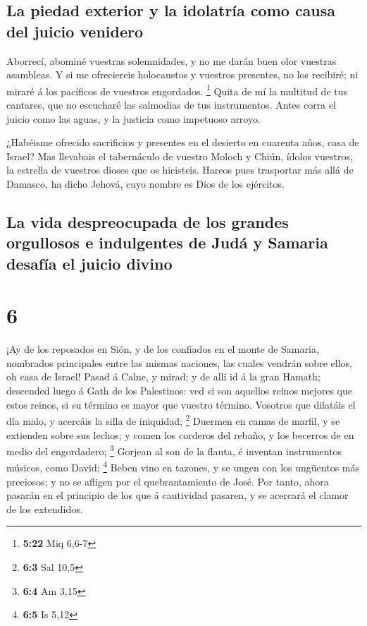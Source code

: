 \hypertarget{la-piedad-exterior-y-la-idolatruxeda-como-causa-del-juicio-venidero}{%
\subsection{La piedad exterior y la idolatría como causa del juicio
venidero}\label{la-piedad-exterior-y-la-idolatruxeda-como-causa-del-juicio-venidero}}

 Aborrecí, abominé vuestras solemnidades, y no me darán
buen olor vuestras asambleas.  Y si me ofreciereis
holocaustos y vuestros presentes, no los recibiré; ni miraré á los
pacíficos de vuestros engordados. \footnote{\textbf{5:22} Miq 6,6-7}
 Quita de mí la multitud de tus cantares, que no
escucharé las salmodias de tus instrumentos.  Antes corra
el juicio como las aguas, y la justicia como impetuoso arroyo.

 ¿Habéisme ofrecido sacrificios y presentes en el
desierto en cuarenta años, casa de Israel?  Mas llevabais
el tabernáculo de vuestro Moloch y Chiún, ídolos vuestros, la estrella
de vuestros dioses que os hicisteis.  Hareos pues
trasportar más allá de Damasco, ha dicho Jehová, cuyo nombre es Dios de
los ejércitos.

\hypertarget{la-vida-despreocupada-de-los-grandes-orgullosos-e-indulgentes-de-juduxe1-y-samaria-desafuxeda-el-juicio-divino}{%
\subsection{La vida despreocupada de los grandes orgullosos e
indulgentes de Judá y Samaria desafía el juicio
divino}\label{la-vida-despreocupada-de-los-grandes-orgullosos-e-indulgentes-de-juduxe1-y-samaria-desafuxeda-el-juicio-divino}}

\hypertarget{section-5}{%
\section{6}\label{section-5}}

 ¡Ay de los reposados en Sión, y de los confiados en el
monte de Samaria, nombrados principales entre las mismas naciones, las
cuales vendrán sobre ellos, oh casa de Israel!  Pasad á
Calne, y mirad; y de allí id á la gran Hamath; descended luego á Gath de
los Palestinos: ved si son aquellos reinos mejores que estos reinos, si
su término es mayor que vuestro término.  Vosotros que
dilatáis el día malo, y acercáis la silla de iniquidad; \footnote{\textbf{6:3}
  Sal 10,5}  Duermen en camas de marfil, y se extienden
sobre sus lechos; y comen los corderos del rebaño, y los becerros de en
medio del engordadero; \footnote{\textbf{6:4} Am 3,15} 
Gorjean al son de la flauta, é inventan instrumentos músicos, como
David; \footnote{\textbf{6:5} Is 5,12}  Beben vino en
tazones, y se ungen con los ungüentos más preciosos; y no se afligen por
el quebrantamiento de José.  Por tanto, ahora pasarán en
el principio de los que á cautividad pasaren, y se acercará el clamor de
los extendidos.

